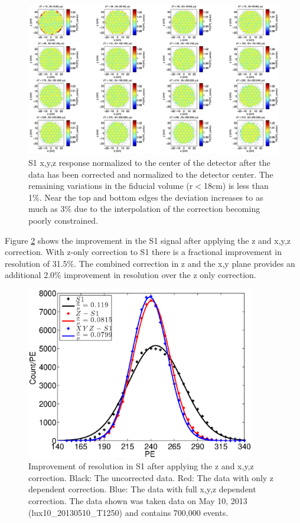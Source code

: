 \renewcommand{\baselinestretch}{1}
\small\normalsize
\begin{figure}\centering
\includegraphics[width=220mm]{Chapter_XYZ_Corr/Thesis_Corr_Plots/S1_XYZ_Kr_FlatField_norm_center_crop.png}
\caption{S1 x,y,z response normalized to the center of the detector after the data has been corrected and normalized to the detector center. The remaining variations in the fiducial volume (r$<$18cm) is less than 1\%. Near the top and bottom edges the deviation increases to as much as 3\% due to the interpolation of the correction becoming poorly constrained.}
\label{fig:S1_XYZ_norm_center}
\end{figure}
\renewcommand{\baselinestretch}{2}
\small\normalsize


Figure \ref{fig:S1_res} shows the improvement in the S1 signal after applying the z and x,y,z correction. With z-only correction to S1 there is a fractional improvement in resolution of 31.5\%. The combined correction in z and the x,y plane provides an additional 2.0\% improvement in resolution over the z only correction.

\begin{figure}[h!]\centering
\includegraphics[width=100mm]{Chapter_XYZ_Corr/Thesis_Corr_Plots/S1_corr_res.eps}
\caption{Improvement of resolution in S1 after applying the z and x,y,z correction. Black: The uncorrected data. Red: The data with only z dependent correction. Blue: The data with full x,y,z dependent correction. The data shown was taken data on May 10, 2013 (lux10\_20130510\_T1250) and contains 700,000 \KrCal events.}
\label{fig:S1_res}
\end{figure}

